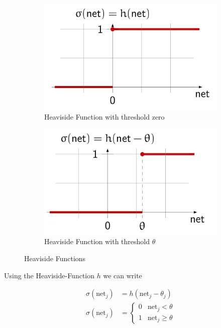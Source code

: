 \documentclass[11pt]{article}
\begin{document}
\begin{figure}[tbh!]
    \centering
    \begin{subfigure}{0.45\linewidth}
        \includegraphics[keepaspectratio,width=\linewidth]{Pictures/heaviside_zero}
        \caption{Heaviside Function with threshold zero}
    \end{subfigure}
    \begin{subfigure}{0.45\linewidth}
        \includegraphics[keepaspectratio,width=\linewidth]{Pictures/heaviside_theta}
        \caption{Heaviside Function with threshold $\theta$}
    \end{subfigure}
    \caption{Heaviside Functions}
    \label{fig:heavisidefunction}
\end{figure}

Using the Heaviside-Function $h$ we can write

\begin{align}
    \sigma(\text{net}_j) &= h(\text{net}_j - \theta_j)\\
    \sigma(\text{net}_j) &= \left\{ \begin{matrix}0 & \text{net}_j < \theta\\1 & \text{net}_j \geq \theta\end{matrix} \right.
\end{align}
\end{document}

